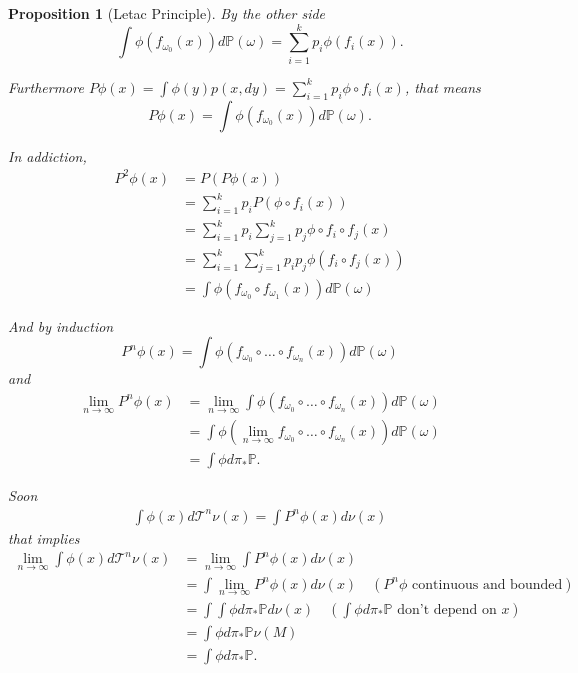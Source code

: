 \documentclass[a4paper]{article}
\theoremstyle{plain}
\newtheorem{prop} [theorem]{Proposition}
\theoremstyle{definition}
\begin{document}
\begin{prop}[Letac Principle]
    By the other side 
    $$ \int \phi(f_{\omega_0}(x)) d\mathbb{P}(\omega) = \sum_{i=1}^{k} p_i \phi(f_i(x)).$$

    Furthermore  $P \phi(x) = \int \phi(y) p(x,dy) =\displaystyle\sum_{i=1}^{k}p_i \phi \circ f_i(x)$, that means 
    $$P \phi(x) = \int \phi(f_{\omega_0}(x)) d\mathbb{P}(\omega).$$

    In addiction, 
    \begin{align*}
       P^2 \phi(x) &= P (P \phi(x))\\
       &= \sum_{i=1}^{k} p_i P (\phi \circ f_i (x) )\\
       &= \sum_{i=1}^{k} p_i \displaystyle\sum_{j=1}^{k}p_j \phi \circ f_i \circ f_j(x)\\
       &= \sum_{i=1}^{k}\sum_{j=1}^{k} p_i p_j \phi ( f_i \circ f_j(x))\\
       &=\int \phi(f_{\omega_0}\circ f_{\omega_1}(x)) d\mathbb{P}(\omega)
    \end{align*}

    And by induction 
    $$ P^n \phi(x) =\int \phi(f_{\omega_0}\circ \dots \circ f_{\omega_n}(x)) d\mathbb{P}(\omega)$$
and 
    \begin{align*}
    \lim_{n \to \infty} P^n \phi(x) 
    &=\lim_{n \to \infty} \int \phi(f_{\omega_0}\circ \dots \circ f_{\omega_n}(x)) d\mathbb{P}(\omega)\\
    &= \int \phi(\lim_{n \to \infty} f_{\omega_0}\circ \dots \circ f_{\omega_n}(x)) d\mathbb{P}(\omega)\\
    &=\int \phi d\pi_*\mathbb{P}.
    \end{align*}

    Soon 
    \begin{align*}
    \int \phi(x) d\mathcal{T}^n\nu(x) = \int P^n \phi(x) d\nu(x) 
    \end{align*}
that implies 
    \begin{align*}
    \lim_{n \to \infty} \int \phi(x) d\mathcal{T}^n\nu(x) 
    &= \lim_{n \to \infty} \int P^n \phi(x) d\nu(x) \\  
    &= \int \lim_{n \to \infty} P^n \phi(x) d\nu(x) \,\,\,\,\,\,(P^n \phi \text{ continuous and bounded})\\  
    &= \int \int \phi d\pi_*\mathbb{P} d\nu(x) \,\,\,\,\,\,(\int \phi d\pi_*\mathbb{P} \text{ don't depend on }x)\\
    &= \int \phi d\pi_*\mathbb{P} \nu(M)\\
    &= \int \phi d\pi_*\mathbb{P}.
    \end{align*}


\end{prop}
\end{document}
